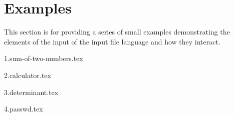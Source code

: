 
\chapter{Examples}
{
	This section is for providing a series of small examples
	demonstrating the elements of the input of the input file language
	and how they interact.
	
	{1.sum-of-two-numbers.tex}
	
	{2.calculator.tex}
	
	{3.determinant.tex}
	
	{4.passwd.tex}
}

